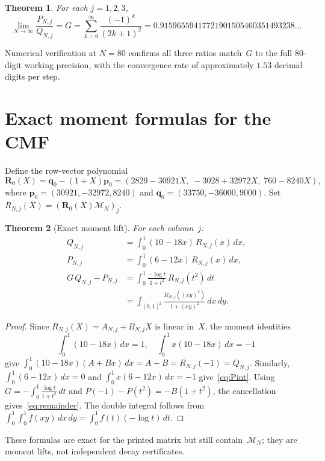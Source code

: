 \documentclass[11pt]{article}
\newtheorem{theorem}{Theorem}
\begin{document}
\begin{theorem}\label{thm:main}
For each $j = 1,2,3$,
\[
\lim_{N\to\infty} \frac{P_{N,j}}{Q_{N,j}} = G
= \sum_{k=0}^{\infty} \frac{(-1)^k}{(2k+1)^2}
= 0.91596559417721901505460351493238\ldots
\]
\end{theorem}

Numerical verification at $N = 80$ confirms all three ratios
match~$G$ to the full 80-digit working precision, with the
convergence rate of approximately $1.53$ decimal digits per step.

\section{Exact moment formulas for the CMF}

Define the row-vector polynomial
\[
\mathbf{R}_0(X) = \mathbf{q}_0 - (1+X)\mathbf{p}_0
= (2829 - 30921X,\; -3028 + 32972X,\; 760 - 8240X),
\]
where $\mathbf{p}_0 = (30921, -32972, 8240)$ and
$\mathbf{q}_0 = (33750, -36000, 9000)$.  Set
$R_{N,j}(X) = (\mathbf{R}_0(X)\mathcal{M}_N)_j$.

\begin{theorem}[Exact moment lift]\label{thm:moment}
For each column~$j$:
\begin{align}
Q_{N,j} &= \int_0^1 (10-18x)\,R_{N,j}(x)\,dx, \label{eq:Qint}\\
P_{N,j} &= \int_0^1 (6-12x)\,R_{N,j}(x)\,dx, \label{eq:Pint}\\
G\,Q_{N,j} - P_{N,j}
&= \int_0^1 \frac{-\log t}{1+t^2}\,R_{N,j}(t^2)\,dt
\label{eq:remainder} \\
&= \int_{[0,1]^2}
\frac{R_{N,j}((xy)^2)}{1+(xy)^2}\,dx\,dy.
\label{eq:double}
\end{align}
\end{theorem}

\begin{proof}
Since $R_{N,j}(X) = A_{N,j} + B_{N,j}X$ is linear in~$X$,
the moment identities
\[
\int_0^1(10-18x)\,dx = 1,\quad
\int_0^1 x(10-18x)\,dx = -1
\]
give $\int_0^1(10-18x)(A+Bx)\,dx = A-B = R_{N,j}(-1) = Q_{N,j}$.
Similarly, $\int_0^1(6-12x)\,dx = 0$ and
$\int_0^1 x(6-12x)\,dx = -1$ give~\eqref{eq:Pint}.
Using $G = -\int_0^1 \frac{\log t}{1+t^2}\,dt$ and
$P(-1) - P(t^2) = -B(1+t^2)$,
the cancellation gives~\eqref{eq:remainder}.
The double integral follows from
$\int_0^1\!\int_0^1 f(xy)\,dx\,dy
= \int_0^1 f(t)(-\log t)\,dt$.
\end{proof}

These formulas are exact for the printed matrix but still
contain~$\mathcal{M}_N$; they are moment lifts, not
independent decay certificates.
\end{document}
